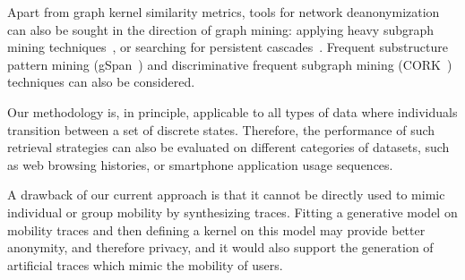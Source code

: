 Apart from graph kernel similarity metrics, tools for network deanonymization can also be sought in the direction of graph mining: applying heavy subgraph mining techniques~\cite{Bogdanov2011}, or searching for persistent cascades~\cite{Morse16}.
Frequent substructure pattern mining (gSpan~\cite{Yan2002}) and discriminative frequent subgraph mining (CORK~\cite{Thoma2010}) techniques can also be considered.

Our methodology is, in principle, applicable to all types of data where individuals transition between a set of discrete states.
Therefore, the performance of such retrieval strategies can also be evaluated on different categories of datasets, such as web browsing histories, or smartphone application usage sequences.

A drawback of our current approach is that it cannot be directly used to mimic individual or group mobility by synthesizing traces.
Fitting a generative model on mobility traces and then defining a kernel on this model may provide better anonymity, and therefore privacy, and it would also support the generation of artificial traces which mimic the mobility of users.
